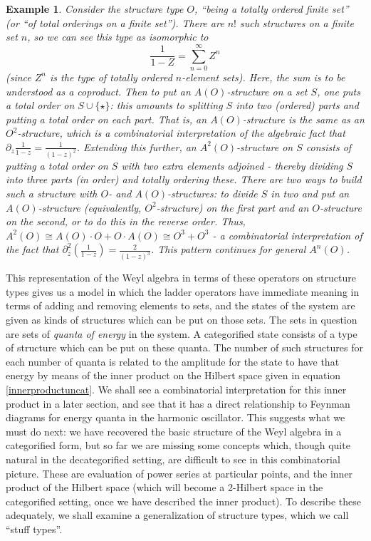 \documentclass{amsart} \usepackage{amsmath,amssymb,bbm}
\newtheorem{varexample}{Example}
\newenvironment{example}{\begin{varexample}\em}{\em\end{varexample}}
\begin{document}
\begin{example}
  Consider the structure type $O$, ``being a totally ordered finite set'' (or
  ``of total orderings on a finite set'').  There are $n!$ such structures on
  a finite set $n$, so we can see this type as isomorphic to
  \begin{equation}
    \frac{1}{1 - Z} = \sum_{n = 0}^{\infty} Z^n
  \end{equation} (since $Z^n$ is the type of totally ordered
  $n$-element sets). Here, the sum is to be understood as a coproduct.
  Then to put an $A ( O )$-structure on a set $S$, one puts a total
  order on $S \cup \{ \star \}$: this amounts to splitting $S$ into
  two (ordered) parts and putting a total order on each part.  That
  is, an $A ( O )$-structure is the same as an $O^2$-structure, which
  is a combinatorial interpretation of the algebraic fact that
  $\partial_z \frac{1}{1 - z} = \frac{1}{( 1 - z )^2}$.  Extending
  this further, an $A^2 ( O )$-structure on $S$ consists of putting a
  total order on $S$ with two extra elements adjoined - thereby
  dividing $S$ into three parts (in order) and totally ordering these.
  There are two ways to build such a structure with $O$- and $A ( O
  )$-structures: to divide $S$ in two and put an $A ( O )$-structure
  (equivalently, $O^2$-structure) on the first part and an
  $O$-structure on the second, or to do this in the reverse order.
  Thus, $A^2 ( O ) \cong A ( O ) \cdot O + O \cdot A ( O ) \cong O^3 +
  O^3$ - a combinatorial interpretation of the fact that $\partial_z^2
  ( \frac{1}{1 - z} ) = \frac{2}{( 1 - z )^3}$.  This pattern
  continues for general $A^n ( O )$.
\end{example}

This representation of the Weyl algebra in terms of these operators on
structure types gives us a model in which the ladder operators have immediate
meaning in terms of adding and removing elements to sets, and the states of
the system are given as kinds of structures which can be put on those sets. 
The sets in question are sets of {\textit{quanta of energy}} in the system.  A
categorified state consists of a type of structure which can be put on these
quanta.  The number of such structures for each number of quanta is related
to the amplitude for the state to have that energy by means of the inner
product on the Hilbert space given in equation \ref{innerproductuncat}.  We
shall see a combinatorial interpretation for this inner product in a later
section, and see that it has a direct relationship to Feynman diagrams for
energy quanta in the harmonic oscillator.  This suggests what we must do
next: we have recovered the basic structure of the Weyl algebra in a
categorified form, but so far we are missing some concepts which, though quite
natural in the decategorified setting, are difficult to see in this
combinatorial picture.  These are evaluation of power series at particular
points, and the inner product of the Hilbert space (which will become a
2-Hilbert space in the categorified setting, once we have described the inner
product). To describe these adequately, we shall examine a generalization of
structure types, which we call ``stuff types''.
\end{document}
